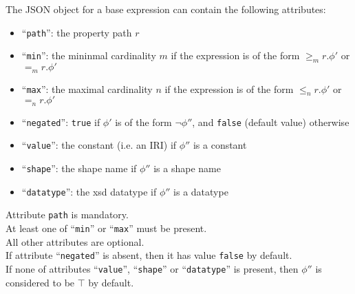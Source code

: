 \documentclass[]{article}
\newcommand{\exFont}[1]{\texttt{{\small #1}}}
\begin{document}
The JSON object for a base expression can contain the following attributes:
\begin{itemize}
\item ``\exFont{path}'': the property path $r$
\item ``\exFont{min}'': the mininmal cardinality $m$ if the expression is of the form $\geq_m r.\phi'$ or $=_m r.\phi'$
\item ``\exFont{max}'': the maximal cardinality $n$ if the expression is of the form $\leq_n r.\phi'$ or $=_n r.\phi'$
\item ``\exFont{negated}'': \exFont{true} if $\phi'$ is of the form $\neg \phi''$, and \exFont{false} (default value) otherwise
\item ``\exFont{value}'': the constant (i.e. an IRI) if $\phi''$ is a constant
\item ``\exFont{shape}'': the shape name if $\phi''$ is a shape name
\item ``\exFont{datatype}'': the xsd datatype if $\phi''$ is a datatype
\end{itemize}
Attribute \exFont{path} is mandatory.\\
At least one of ``\exFont{min}'' or ``\exFont{max}'' must be present.\\
All other attributes are optional.\\

\noindent If attribute ``\exFont{negated}'' is absent, then it has value \exFont{false} by default.\\
If none of attributes ``\exFont{value}'', ``\exFont{shape}'' or ``\exFont{datatype}'' is present,
then $\phi''$ is considered to be $\top$ by default.
\end{document}
